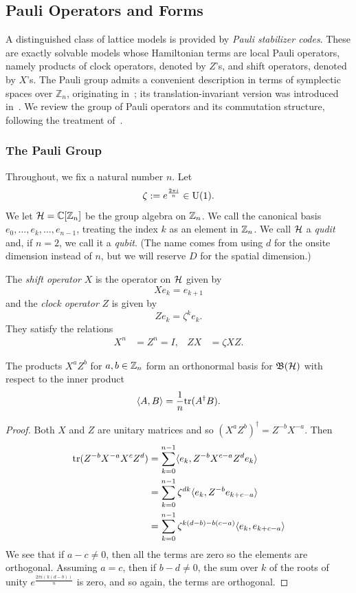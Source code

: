 \documentclass[11pt]{amsart}
\begin{document}
\subsection{Pauli Operators and Forms}

A distinguished class of lattice models is provided by \emph{Pauli stabilizer codes}. These are exactly solvable models whose Hamiltonian terms are local Pauli operators, namely products of clock operators, denoted by $Z$'s, and shift operators, denoted by $X$'s. The Pauli group admits a convenient description in terms of symplectic spaces over $\mathbb Z_n$, originating in~\cite{calderbank1997quantum}; its translation-invariant version was introduced in~\cite{HaahCommuting}. We review the group of Pauli operators and its commutation structure, following the treatment of~\cite{RYWitt}.



\subsubsection{The Pauli Group}
Throughout, we fix a natural number $n$. Let
\[\zeta := e^{\frac{2\pi i}{n}}  \in \rm U(1).\]
We let $\mathcal{H}=\mathbb{C}[\mathbb{Z}_n]$ be the group algebra on $\mathbb{Z}_n$.
We call the canonical basis $e_0,\ldots, e_{k},\ldots,  e_{n-1}$, treating the index $k$ as an element in $\mathbb{Z}_n$.  We call $\mathcal{H}$ a \emph{qudit} and, if $n=2$, we call it a \emph{qubit}. (The name comes from using $d$ for the onsite dimension instead of $n$, but we will reserve $D$ for the spatial dimension.)

The \emph{shift operator} $X$ is the operator on $\mathcal{H}$ given by
\[ X e_k= e_{k+1}\]
and the \emph{clock operator} $Z$ is given by
\[ Ze_k= \zeta^k e_k.\]
They satisfy the relations
\begin{align*}
X^n &= Z^n =I, & ZX &= \zeta XZ .
\end{align*}
\begin{lem}\label{lem:paulisgen}
The products $X^{a}Z^b$ for $a,b\in \mathbb{Z}_n$ form an orthonormal basis for $\mathfrak{B}(\mathcal{H})$ with respect to the inner product
\[\langle A,B\rangle = \frac{1}{n}\mathrm{tr}(A^\dagger B).\]
\end{lem}
\begin{proof}
Both $X$ and $Z$ are unitary matrices and so $(X^aZ^b)^\dagger = Z^{-b}X^{-a}$.
Then
\begin{align*}
 \mathrm{tr}(Z^{-b}X^{-a}X^cZ^d) &=  \sum_{k=0}^{n-1} \langle e_k , Z^{-b} X^{c-a}Z^d e_k\rangle \\
&=  \sum_{k=0}^{n-1} \zeta^{dk}  \langle e_k ,  Z^{-b}e_{k+c-a}\rangle \\
&=  \sum_{k=0}^{n-1} \zeta^{k(d-b)-b(c-a)} \langle e_k ,  e_{k+c-a}\rangle \\
\end{align*}
We see that if $a-c\neq 0$, then all the terms are zero so the elements are orthogonal. Assuming $a=c$, then
if $b-d\neq 0$, the sum over $k$ of the roots of unity $e^{\frac{2\pi i( k(d-b))}{n}}$ is zero, and so again, the terms are orthogonal.
\end{proof}
\end{document}
